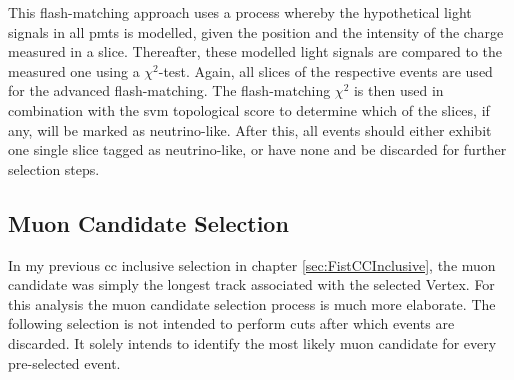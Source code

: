 This flash-matching approach uses a process whereby the hypothetical light signals in all \glspl{pmt} is modelled, given the position and the intensity of the charge measured in a slice. Thereafter, these modelled light signals are compared to the measured one using a $\chi^2$-test. Again, all slices of the respective events are used for the advanced flash-matching. The flash-matching $\chi^2$ is then used in combination with the \gls{svm} topological score to determine which of the slices, if any, will be marked as neutrino-like. After this, all events should either exhibit one single slice tagged as neutrino-like, or have none and be discarded for further selection steps.

\subsection{Muon Candidate Selection} \label{sec:NewMuonCandidateSelection}
In my previous \gls{cc} inclusive selection in chapter \ref{sec:FistCCInclusive}, the muon candidate was simply the longest track associated with the selected \gls{Vertex}. For this analysis the muon candidate selection process is much more elaborate. The following selection is not intended to perform cuts after which events are discarded. It solely intends to identify the most likely muon candidate for every pre-selected event. 

